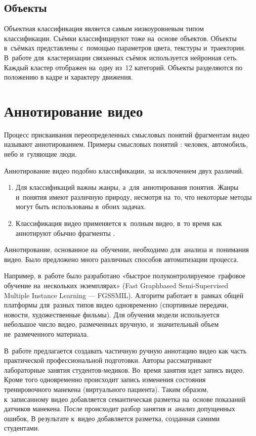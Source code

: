 \subsection{Объекты}

Объектная классификация является самым низкоуровневым типом классификации.
Съёмки классифицируют тоже на~основе объектов.
Объекты в~съёмках представлены с~помощью параметров цвета, текстуры и~траектории.
В~работе \cite{Hong:2005} для~кластеризации связанных съёмок
используется нейронная сеть.
Каждый кластер отображен на~одну из~12 категорий.
Объекты разделяются по положению в кадре и характеру движения.


\section{Аннотирование видео}

Процесс присваивания переопределенных смысловых понятий фрагментам видео
называют аннотированием. Примеры смысловых понятий : человек,
автомобиль, небо и~гуляющие люди.

Аннотирование видео подобно классификации, за исключением двух различий.
\begin{enumerate}
    \item Для классификаций важны жанры, а~для~аннотирования понятия.
        Жанры и~понятия имеют различную природу, несмотря на~то,
        что некоторые методы могут быть использованы в~обоих задачах.
    \item Классификация видео применяется к~полным видео,
        в~то время как аннотируют обычно фрагменты \cite{Yang:2007}.
\end{enumerate}

Аннотирование, основанное на~обучении, необходимо для~анализа
и~понимания видео. Было предложено много различных способов
автоматизации процесса.

Например, в~работе \cite{Zhang:2012} было
разработано «быстрое полуконтролируемое\
графовое обучение на~нескольких экземплярах»
(Fast Graphbased Semi-Supervised Multiple Instance Learning — FGSSMIL).
Алгоритм работает в~рамках общей платформы для~разных типов видео одновременно
(спортивные передачи, новости, художественные фильмы).
Для обучения модели используется небольшое число видео, размеченных вручную,
и~значительный объем не~размеченного материала.

В~работе \cite{Weal:2012} предлагается создавать
частичную ручную аннотацию видео
как часть практической профессиональной подготовки.
Авторы рассматривают лабораторные занятия студентов-медиков.
Во~время занятия идет запись видео.
Кроме того одновременно происходит запись изменения состояния
тренировочного манекена (виртуального пациента).
Таким образом, к~записанному видео добавляется семантическая разметка
на~основе показаний датчиков манекена.
После происходит разбор занятия и~анализ допущенных ошибок,
В результате к~видео добавляется разметка, созданная самими студентами.

